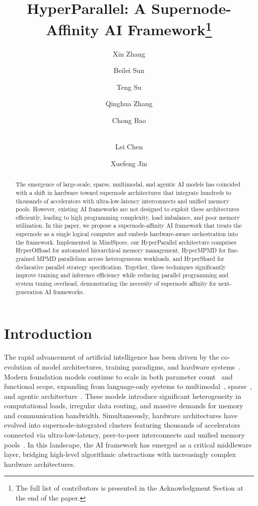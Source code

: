 \documentclass[11pt]{article}
\title{HyperParallel: A Supernode-Affinity AI Framework\footnote{The full list of contributors is presented in the Acknowledgment Section at the end of the paper.}}
\author[$\dagger$]{Xin Zhang}
\author[$\ddagger$]{Beilei Sun}
\author[$\ddagger$]{Teng Su}
\author[$\ddagger$]{Qinghua Zhang}
\author[$\ddagger$]{Chong Bao}
\author[$\dagger$]{\\Lei Chen}
\author[$\ddagger$]{Xuefeng Jin}
\affil[$\dagger$]{\textit{HKUST and HKUST(GZ), Hong Kong and Guangzhou, China}}
\affil[$\ddagger$]{\textit{Huawei Technologies Co., Ltd., China}}
\date{}
\begin{document}
\maketitle

\thispagestyle{firstpage}

\begingroup
\renewcommand\thefootnote{*}
\endgroup

\begin{abstract}
The emergence of large-scale, sparse, multimodal, and agentic AI models has coincided with a shift in hardware toward supernode architectures that integrate hundreds to thousands of accelerators with ultra-low-latency interconnects and unified memory pools. However, existing AI frameworks are not designed to exploit these architectures efficiently, leading to high programming complexity, load imbalance, and poor memory utilization. In this paper, we propose a supernode-affinity AI framework that treats the supernode as a single logical computer and embeds hardware-aware orchestration into the framework. Implemented in MindSpore, our HyperParallel architecture comprises HyperOffload for automated hierarchical memory management, HyperMPMD for fine-grained MPMD parallelism across heterogeneous workloads, and HyperShard for declarative parallel strategy specification. Together, these techniques significantly improve training and inference efficiency while reducing parallel programming and system tuning overhead, demonstrating the necessity of supernode affinity for next-generation AI frameworks.
\end{abstract}

\section{Introduction}
The rapid advancement of artificial intelligence has been driven by the co-evolution of model architectures, training paradigms, and hardware systems~\cite{mudigere2022software,pandey2019machine, paszke2019pytorch}. Modern foundation models continue to scale in both parameter count~\cite{fedus2022switch,hoffmann2022training,ren2023pangu} and functional scope, expanding from language-only systems to multimodal~\cite{sun2024generative}, sparse~\cite{chen2022towards,dettmers2023spqr}, and agentic architecture~\cite{yu2025dapo}. These models introduce significant heterogeneity in computational loads, irregular data routing, and massive demands for memory and communication bandwidth. Simultaneously, hardware architectures have evolved into supernode-integrated clusters featuring thousands of accelerators connected via ultra-low-latency, peer-to-peer interconnects and unified memory pools~\cite{li2023pond,ubmesh,matrix384}. In this landscape, the AI framework has emerged as a critical middleware layer, bridging high-level algorithmic abstractions with increasingly complex hardware architectures.
\end{document}
